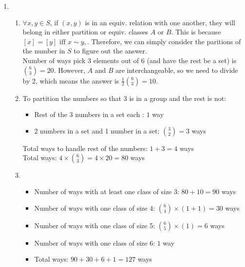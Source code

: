 \documentclass{article}
\begin{document}
\begin{enumerate}[label=(\alph*)]
    \item \begin{enumerate}[label=\roman*.]
              \item $\forall x, y \in S$, if $(x,y)$ is in an equiv. relation with one another, they will belong in either partition or equiv. classes $A$ or $B$. This is because $ [x] = [y] \text{ iff } x \sim y,$. Therefore, we can simply consider the paritions of the number in $S$ to figure out the answer.\\
                    Number of ways pick 3 elements out of 6 (and have the rest be a set) is $\binom{6}{3} = 20$. However, $A$ and $B$ are interchangeable, so we need to divide by 2, which means the answer is $\frac{1}{2} \binom{6}{3} = 10$.
              \item To partition the numbers so that 3 is in a group and the rest is not:
                    \begin{itemize}
                        \item Rest of the 3 numbers in a set each : $1$ way
                        \item 2 numbers in a set and 1 number in a set: $\binom{3}{2}= 3$ ways
                    \end{itemize}
                    Total ways to handle rest of the numbers: $1 + 3 = 4$ ways\\
                    Total ways: $4 \times \binom{6}{3} = 4 \times 20 = 80$ ways

              \item \begin{itemize}
                        \item Number of ways with at least one class of size 3: $80+10 = 90$ ways
                        \item Number of ways with one class of size 4: $\binom{6}{4} \times (1 + 1) = 30$ ways
                        \item Number of ways with one class of size 5: $\binom{6}{5} \times (1) = 6$ ways
                        \item Number of ways with one class of size 6: $1$ way
                        \item Total ways: $90 + 30 + 6 + 1 = 127$ ways
                    \end{itemize}


\end{enumerate}
\end{enumerate}
\end{document}
